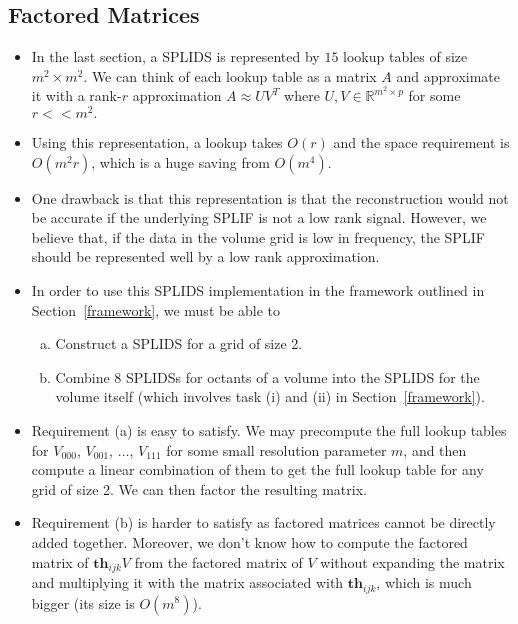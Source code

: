 \documentclass[10pt]{article}
\newcommand{\Th}{\mathbf{th}}
\begin{document}
\subsection{Factored Matrices}

\begin{itemize}
    \item In the last section, a SPLIDS is represented by
        $15$ lookup tables of size $m^2 \times m^2$. We
        can think of each lookup table as a matrix $A$ and
        approximate it with a rank-$r$ approximation
        $A \approx UV^T$ where $U,V \in \mathbb{R}^{m^2 \times p}$
        for some $r << m^2.$
        
    \item Using this representation, a lookup takes $O(r)$
    and the space requirement is $O(m^2r)$, which is a huge
    saving from $O(m^4)$.
    
    \item One drawback is that this representation is that
        the reconstruction would not be accurate if the underlying
        SPLIF is not a low rank signal. However, we believe
        that, if the data in the volume grid is low in frequency,
        the SPLIF should be represented well by a low rank
        approximation.
        
    \item In order to use this SPLIDS implementation in the
    framework outlined in Section~\ref{framework}, we
    must be able to
    \begin{enumerate}[(a)]
        \item Construct a SPLIDS for a grid of size 2.
        \item Combine 8 SPLIDSs for octants of a volume
            into the SPLIDS for the volume itself
            (which involves task (i) and (ii) in
            Section~\ref{framework}).            
    \end{enumerate}
    
    \item Requirement (a) is easy to satisfy. We may precompute
        the full lookup tables for $V_{000}$, $V_{001}$, $\dotsc$,
        $V_{111}$ for some small resolution parameter $m$, and
        then compute a linear combination of them to get the full
        lookup table for any grid of size 2. We can then factor
        the resulting matrix.
        
    \item Requirement (b) is harder to satisfy as factored matrices
        cannot be directly added together. Moreover, we don't know 
        how to compute the factored matrix of $\Th_{ijk}V$
        from the factored matrix of $V$ without expanding
        the matrix and multiplying it with the matrix 
        associated with $\Th_{ijk}$, which is much bigger 
        (its size is $O(m^8)$).
        

\end{itemize}
\end{document}
